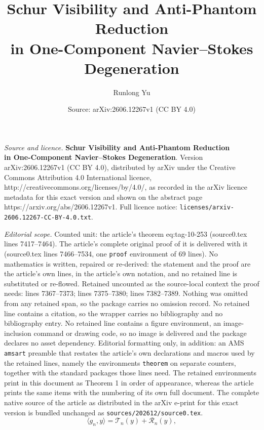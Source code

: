 \documentclass[10pt,a4paper]{amsart}
\title{\textbf{Schur Visibility and Anti-Phantom Reduction\\ in One-Component Navier--Stokes Degeneration}}
\author{Runlong Yu}
\date{Source: arXiv:2606.12267v1 (CC BY 4.0)}
\begin{document}
\maketitle

\noindent\emph{Source and licence.} \textbf{Schur Visibility and Anti-Phantom Reduction\\ in One-Component Navier--Stokes Degeneration}. Version arXiv:2606.12267v1 (CC BY 4.0), distributed by arXiv under the Creative Commons Attribution 4.0 International licence, http://creativecommons.org/licenses/by/4.0/, as recorded in the arXiv licence metadata for this exact version and shown on the abstract page https://arxiv.org/abs/2606.12267v1. Full licence notice: \texttt{licenses/arxiv-2606.12267-CC-BY-4.0.txt}.\par\smallskip

\noindent\textit{Editorial scope.} Counted unit: the article's theorem eq:tag-10-253 (source0.tex lines 7417--7464). The article's complete original proof of it is delivered with it (source0.tex lines 7466--7534, one \texttt{proof} environment of 69 lines). No mathematics is written, repaired or re-derived: the statement and the proof are the article's own lines, in the article's own notation, and no retained line is substituted or re-flowed.  Retained uncounted as the source-local context the proof needs: lines 7367--7373; lines 7375--7380; lines 7382--7389.  Nothing was omitted from any retained span, so the package carries no omission record.  No retained line contains a citation, so the wrapper carries no bibliography and no bibliography entry.  No retained line contains a figure environment, an image-inclusion command or drawing code, so no image is delivered and the package declares no asset dependency.  Editorial formatting only, in addition: an AMS \texttt{amsart} preamble that restates the article's own declarations and macros used by the retained lines, namely the environments \texttt{theorem} on separate counters, together with the standard packages those lines need.  The retained environments print in this document as Theorem 1 in order of appearance, whereas the article prints the same items with the numbering of its own full document.  The complete native source of the article as distributed in the arXiv e-print for this exact version is bundled unchanged as \texttt{sources/202612/source0.tex}.
\begin{equation}
\langle g_n,y\rangle =
\mathcal T_n(y)
+
\mathcal R_n(y),
\label{eq:tag-10-247}
\end{equation}
\end{document}

